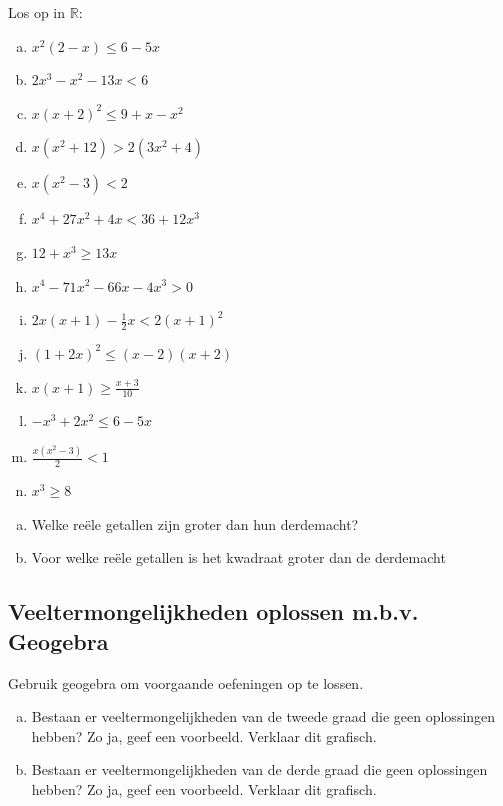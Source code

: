 \documentclass[12pt,twoside,a4paper]{article}
\begin{document}
\begin{oefening}
  Los op in $\mathbb{R}$:
  \begin{multicols}{2}
    \begin{enumerate}[(a)]
      \itemsep0.8em
    \item $x^2(2-x)\leq6-5x$
    \item $2x^3-x^2-13x<6$
    \item $x(x+2)^2\leq9+x-x^2$
    \item $x(x^2+12)>2(3x^2+4)$
    \item $x(x^2-3)<2$
    \item $x^4+27x^2+4x<36+12x^3$
    \item $12+x^3\geq13x$
    \item $x^4-71x^2-66x-4x^3>0$
    \item $2x(x+1)-\frac{1}{2}x<2(x+1)^2$
    \item $(1+2x)^2\leq(x-2)(x+2)$
    \item $x(x+1)\geq\frac{x+3}{10}$
    \item $-x^3+2x^2\leq6-5x$
    \item $\frac{x(x^2-3)}{2}<1$
    \item $x^3\geq8$
    \end{enumerate}
  \end{multicols}
\end{oefening}

\begin{oefening}
  \begin{enumerate}[(a)]
    \itemsep.8em
  \item Welke reële getallen zijn groter dan hun derdemacht?
  \item Voor welke reële getallen is het kwadraat groter dan de derdemacht
  \end{enumerate}
\end{oefening}

\subsection{Veeltermongelijkheden oplossen m.b.v. Geogebra}


\begin{oefening}
Gebruik geogebra om voorgaande oefeningen op te lossen.
\end{oefening}

\begin{oefening}
  \begin{enumerate}[(a)]
  \item Bestaan er veeltermongelijkheden van de tweede graad die geen
    oplossingen hebben? Zo ja, geef een voorbeeld. Verklaar dit
    grafisch.
  \item Bestaan er veeltermongelijkheden van de derde graad die geen
    oplossingen hebben? Zo ja, geef een voorbeeld. Verklaar dit
    grafisch.
  \end{enumerate}
\end{oefening}
\end{document}
